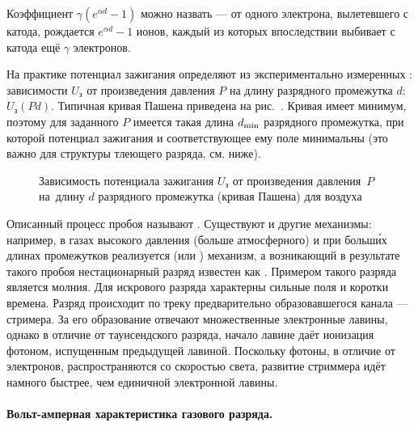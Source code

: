 Коэффициент $\gamma (e^{\alpha d}-1)$ можно назвать
 --- от одного электрона,
вылетевшего с катода, рождается $e^{\alpha d}-1$ ионов,
каждый из которых впоследствии выбивает с катода ещё $\gamma$ электронов.

На практике потенциал зажигания определяют из экспериментально измеренных
: зависимости $U_{з}$ от произведения
давления $P$ на длину разрядного промежутка $d$: $U_{з}(Pd)$.
Типичная кривая Пашена приведена на рис.~.
Кривая имеет минимум, поэтому для заданного $P$ имеется такая длина
$d_{\rm min}$ разрядного промежутка,
при которой потенциал зажигания и соответствующее ему поле минимальны
(это важно для структуры тлеющего разряда, см. ниже).

\begin{figure}[h!]
	\centering
	\caption{Зависимость потенциала зажигания $U_\text{з}$ от произведения
давления~$P$ на~длину $d$ разрядного промежутка (кривая Пашена) для воздуха}
\end{figure}


Описанный процесс пробоя называют . Существуют и другие
механизмы: например, в газах высокого давления (больше атмосферного) и при
больш\'{и}х длинах промежутков реализуется 
(или ) механизм, а возникающий в результате такого пробоя
нестационарный разряд известен как . Примером такого разряда
является молния. Для искрового разряда характерны сильные поля и коротки времена.
Разряд происходит по треку предварительно образовавшегося
канала --- стримера. За его образование отвечают множественные электронные лавины,
однако в отличие от таунсендского разряда, начало лавине даёт ионизация
фотоном, испущенным предыдущей лавиной. Поскольку фотоны, в отличие
от электронов, распространяются со скоростью света, развитие стриммера идёт
намного быстрее, чем единичной электронной лавины.

\paragraph{Вольт-амперная характеристика газового разряда.}

